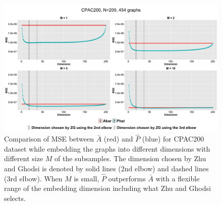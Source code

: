 \begin{figure}[!htb]
\centering
\includegraphics[width=14cm]{CPAC200.png}
\caption{Comparison of MSE between $\bar{A}$ (red) and $\hat{P}$ (blue) for CPAC200 dataset while embedding the graphs into different dimensions with different size $M$ of the subsamples. The dimension chosen by Zhu and Ghodsi is denoted by solid lines (2nd elbow) and dashed lines (3rd elbow). When $M$ is small, $\hat{P}$ outperforms $\bar{A}$ with a flexible range of the embedding dimension including what Zhu and Ghodsi selects.}
\label{fig:CPAC200}
\end{figure}





\newpage

